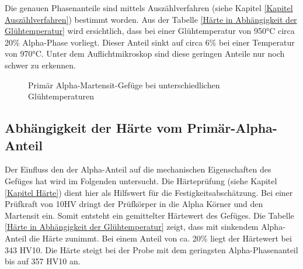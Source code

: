 \documentclass[a4paper, 11pt]{tubsreprt}
\begin{document}
Die genauen Phasenanteile sind mittels Auszählverfahren (siehe Kapitel \ref{Kapitel Auszählverfahren}) bestimmt worden. Aus der Tabelle \ref{Härte in Abhängigkeit der Glühtemperatur} wird ersichtlich, dass bei einer Glühtemperatur von 950°C circa 20\% Alpha-Phase vorliegt. Dieser Anteil sinkt auf circa 6\% bei einer Temperatur von 970°C. Unter dem Auflichtmikroskop sind diese geringen Anteile nur noch schwer zu erkennen.  


\begin{figure}
\caption{Primär Alpha-Martensit-Gefüge bei unterschiedlichen Glühtemperaturen}
\label{Alle Glühen}
\end{figure}


\subsection{Abhängigkeit der Härte vom Primär-Alpha-Anteil} \label{Kapitel Abhängigkeit der Härte vom Primäralphaanteil}
Der Einfluss den der Alpha-Anteil auf die mechanischen Eigenschaften des Gefüges hat wird im Folgenden untersucht. Die Härteprüfung (siehe Kapitel \ref{Kapitel Härte}) dient hier als Hilfswert für die Festigkeitsabschätzung. Bei einer Prüfkraft von 10HV dringt der Prüfkörper in die Alpha Körner und den Martensit ein. Somit entsteht ein gemittelter Härtewert des Gefüges. Die Tabelle \ref{Härte in Abhängigkeit der Glühtemperatur} zeigt, dass mit sinkendem Alpha-Anteil die Härte zunimmt. Bei einem Anteil von ca. 20\% liegt der Härtewert bei 343 HV10. Die Härte steigt bei der Probe mit dem geringsten Alpha-Phasenanteil bis auf 357 HV10 an.
\end{document}

